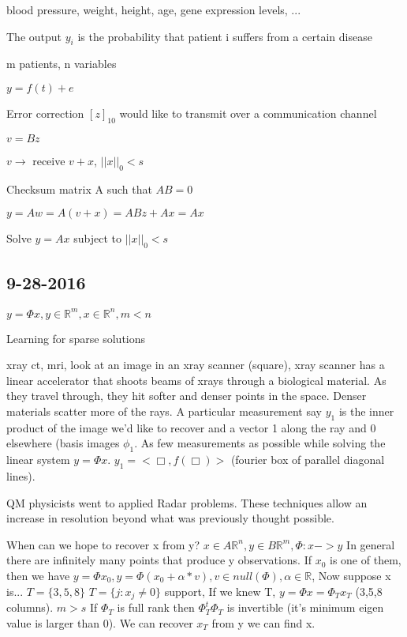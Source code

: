 \documentclass[12pt,letterpaper]{report}
\begin{document}
blood pressure, weight, height, age, gene expression levels, ...

The output $y_i$ is the probability that patient i suffers from a certain disease

m patients, n variables

$y = f(t) + e$

Error correction $[z]_{10}$ would like to transmit over a communication channel

$v = B z$

$v \rightarrow$ receive $v + x$, $||x||_0 < s$

Checksum matrix A such that $AB=0$

$y = Aw = A(v+x) = ABz + Ax = Ax$

Solve $y = Ax$ subject to $||x||_0 < s$

\subsection*{9-28-2016}
$y = \Phi x, y \in \mathbb{R}^m, x \in \mathbb{R}^n, m < n$

Learning for sparse solutions

xray ct, mri, look at an image in an xray scanner (square), xray scanner has a linear accelerator that shoots beams of xrays through a biological material. As they travel through, they hit softer and denser points in the space.  Denser materials scatter more of the rays.  A particular measurement say $y_1$ is the inner product of the image we'd like to recover and a vector 1 along the ray and 0 elsewhere (basis images $\phi_1$.  As few measurements as possible while solving the linear system $y = \Phi x$. $y_1 = < \Box, f(\Box) >$ (fourier box of parallel diagonal lines).

QM physicists went to applied Radar problems.  These techniques allow an increase in resolution beyond what was previously thought possible.

When can we hope to recover x from y?  $x \in A \mathbb{R}^n, y \in B \mathbb{R}^m, \Phi : x -> y$  In general there are infinitely many points that produce y observations.  If $x_0$ is one of them, then we have $y = \Phi x_0, y = \Phi (x_0 + \alpha * v), v \in null(\Phi),  \alpha \in \mathbb{R}$, Now suppose x is... $T = \{ 3,5,8 \}$  $T = \{j : x_j \neq 0 \}$ support, If we knew T, $y = \Phi x = \Phi_T x_T$ (3,5,8 columns).  $m > s$ If $\Phi_T$ is full rank then $\Phi_T^t \Phi_T$ is invertible (it's minimum eigen value is larger than 0).  We can recover $x_T$ from y we can find x.
\end{document}
